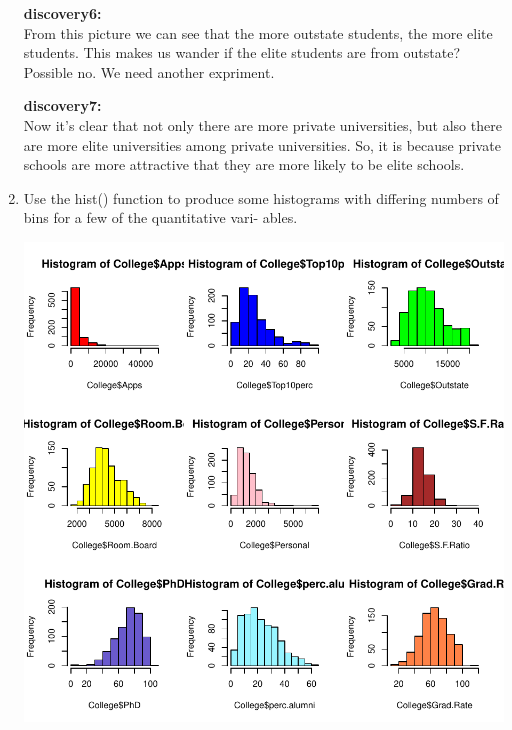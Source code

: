 \documentclass[a4paper]{article}
\begin{document}
\begin{enumerate}
{
\colorbox{BurntOrange}{\textbf{discovery6:}}\color{red}\\
From this picture we can see that the more outstate students, the more elite students. This makes us wander if the elite students are from outstate? Possible no. We need another expriment.
}

{
\colorbox{BurntOrange}{\textbf{discovery7:}}\color{red}\\
Now it's clear that not only there are more private universities, but also there are more elite universities among private universities. So, it is because private schools are more attractive that they are more likely to be elite schools.
}


\item Use the hist() function to produce some histograms with differing numbers of bins for a few of the quantitative vari- ables.

\begin{Schunk}
\end{Schunk}
\includegraphics{introduction-hist}


\end{enumerate}
\end{document}
